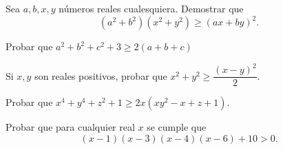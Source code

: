 \documentclass[12pt]{article}
\begin{document}
    \begin{prob-without-section}
        Sea $a,b,x,y$ números reales cualesquiera.
        Demostrar que
        \[
            (a^2 + b^2)(x^2 + y^2) \geq (ax + by)^2.
        \]
    \end{prob-without-section}

    \begin{prob-without-section}
        Probar que $a^2 + b^2 + c^2 + 3 \geq 2(a + b + c)$
    \end{prob-without-section}

    \begin{prob-without-section}
        Si $x,y$ son reales positivos, probar que $x^2 + y^2 \geq \dfrac{(x - y)^2}{2}$.
    \end{prob-without-section}

    \begin{prob-without-section}
        Probar que $x^4 + y^4 + z^2 + 1 \geq 2x(xy^2 - x + z + 1)$.
    \end{prob-without-section}

    \begin{prob-without-section}
        Probar que para cualquier real $x$ se cumple que
        \[
            (x - 1)(x - 3)(x - 4)(x - 6) + 10 > 0.
        \]
    \end{prob-without-section}
\end{document}

